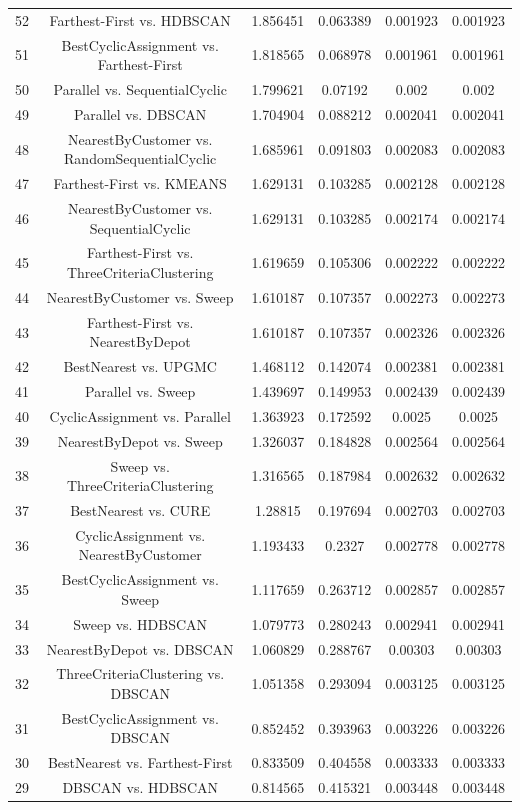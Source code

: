 \documentclass[a4paper,10pt]{article}
\begin{document}
\begin{landscape}
\begin{table}[!htp]
\begin{tabular}{cccccc}
52&Farthest-First vs. HDBSCAN&1.856451&0.063389&0.001923&0.001923\\
51&BestCyclicAssignment vs. Farthest-First&1.818565&0.068978&0.001961&0.001961\\
50&Parallel vs. SequentialCyclic&1.799621&0.07192&0.002&0.002\\
49&Parallel vs. DBSCAN&1.704904&0.088212&0.002041&0.002041\\
48&NearestByCustomer vs. RandomSequentialCyclic&1.685961&0.091803&0.002083&0.002083\\
47&Farthest-First vs. KMEANS&1.629131&0.103285&0.002128&0.002128\\
46&NearestByCustomer vs. SequentialCyclic&1.629131&0.103285&0.002174&0.002174\\
45&Farthest-First vs. ThreeCriteriaClustering&1.619659&0.105306&0.002222&0.002222\\
44&NearestByCustomer vs. Sweep&1.610187&0.107357&0.002273&0.002273\\
43&Farthest-First vs. NearestByDepot&1.610187&0.107357&0.002326&0.002326\\
42&BestNearest vs. UPGMC&1.468112&0.142074&0.002381&0.002381\\
41&Parallel vs. Sweep&1.439697&0.149953&0.002439&0.002439\\
40&CyclicAssignment vs. Parallel&1.363923&0.172592&0.0025&0.0025\\
39&NearestByDepot vs. Sweep&1.326037&0.184828&0.002564&0.002564\\
38&Sweep vs. ThreeCriteriaClustering&1.316565&0.187984&0.002632&0.002632\\
37&BestNearest vs. CURE&1.28815&0.197694&0.002703&0.002703\\
36&CyclicAssignment vs. NearestByCustomer&1.193433&0.2327&0.002778&0.002778\\
35&BestCyclicAssignment vs. Sweep&1.117659&0.263712&0.002857&0.002857\\
34&Sweep vs. HDBSCAN&1.079773&0.280243&0.002941&0.002941\\
33&NearestByDepot vs. DBSCAN&1.060829&0.288767&0.00303&0.00303\\
32&ThreeCriteriaClustering vs. DBSCAN&1.051358&0.293094&0.003125&0.003125\\
31&BestCyclicAssignment vs. DBSCAN&0.852452&0.393963&0.003226&0.003226\\
30&BestNearest vs. Farthest-First&0.833509&0.404558&0.003333&0.003333\\
29&DBSCAN vs. HDBSCAN&0.814565&0.415321&0.003448&0.003448\\

\end{tabular}
\end{table}
\end{landscape}
\end{document}
